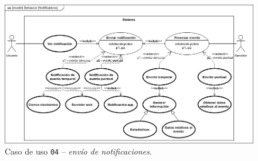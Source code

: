\begin{figure}[H]
  \centering
  \includegraphics[width=\linewidth]{diagrams/UseCases-UC4 - notifications.png}
  \caption{Caso de uso \texttt{04} -- \textit{envío de notificaciones}.}
  \label{uc:notifications}
\end{figure}

